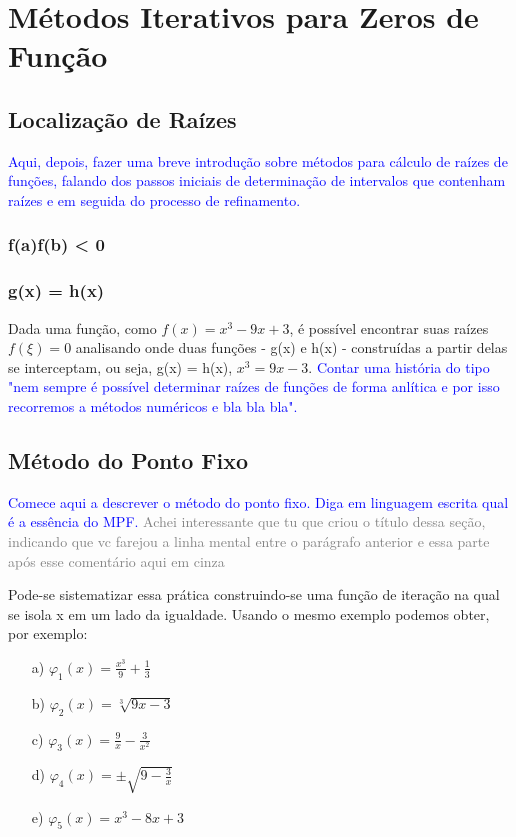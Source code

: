 \chapter{Métodos Iterativos para Zeros de Função}

\section{Localização de Raízes}

\textcolor{blue}{Aqui, depois, fazer uma breve introdução sobre métodos para cálculo de raízes de funções, falando dos passos iniciais de determinação de intervalos que contenham raízes e em seguida do processo de refinamento.}  

\subsection{f(a)f(b) < 0}

\subsection{g(x) = h(x)}

Dada uma função, como $f(x) = x^3 -9x + 3$, é possível encontrar suas raízes $f(\xi) = 0$ analisando onde duas funções - g(x) e h(x) - construídas a partir delas se interceptam, ou seja, g(x) = h(x), $x^3 = 9x - 3$. \textcolor{blue}{Contar uma história do tipo "nem sempre é possível determinar raízes de funções de forma anlítica e por isso recorremos a métodos numéricos e bla bla bla".} %

\section{Método do Ponto Fixo}

\textcolor{blue}{Comece aqui a descrever o método do ponto fixo. Diga em linguagem escrita qual é a essência do MPF.} \textcolor{gray}{Achei interessante que tu que criou o título dessa seção, indicando que vc farejou a linha mental entre o parágrafo anterior e essa parte após esse comentário aqui em cinza}

Pode-se sistematizar essa prática construindo-se uma função de iteração na qual se isola x em um lado da igualdade. Usando o mesmo exemplo podemos obter, por exemplo:

\begin{multicols}{2}
\begin{itemize} %
    \item[a)] $\varphi_1(x) = \frac{x^3}{9} + \frac{1}{3}$
    \item[b)] $\varphi_2(x) = \sqrt[3]{9x-3}$
    \item[c)] $\varphi_3(x) = \frac{9}{x} - \frac{3}{x^2}$
    \item[d)] $\varphi_4(x) = \pm\sqrt{9 - \frac{3}{x}}$
    \item[e)] $\varphi_5(x) = x^3 - 8x + 3$
\end{itemize}
\end{multicols}
    
